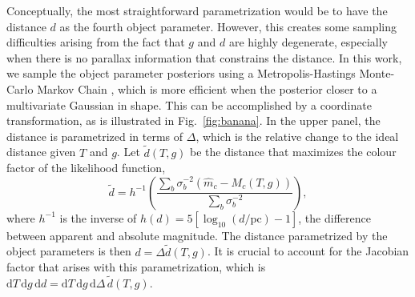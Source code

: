 \documentclass[fleqn,usenatbib]{mnras}
\newcommand{\Teff}{T}
\newcommand{\logg}{g}
\newcommand{\de}{\text{d}}
\begin{document}
Conceptually, the most straightforward parametrization would be to have the distance $d$ as the fourth object parameter. However, this creates some sampling difficulties arising from the fact that $\logg$ and $d$ are highly degenerate, especially when there is no parallax information that constrains the distance. In this work, we sample the object parameter posteriors using a Metropolis-Hastings Monte-Carlo Markov Chain \citep{1953JChPh..21.1087M,2018ApJS..236...11H}, which is more efficient when the posterior closer to a multivariate Gaussian in shape. This can be accomplished by a coordinate transformation, as is illustrated in Fig.~\ref{fig:banana}. In the upper panel, the distance is parametrized in terms of $\Delta$, which is the relative change to the ideal distance given $\Teff$ and $\logg$. Let $\tilde{d}(\Teff,\logg)$ be the distance that maximizes the colour factor of the likelihood function,
\begin{equation}
	\tilde{d} = 
    h^{-1}\left( \frac{\sum_b \sigma_b^{-2} (\hat{m}_c-M_c(\Teff,\logg))}{\sum_b \sigma_b^{-2}} \right),
\end{equation}
where $h^{-1}$ is the inverse of $h(d)=5[\log_{10}(d/\text{pc})-1]$, the difference between apparent and absolute magnitude. The distance parametrized by the object parameters is then $d=\Delta\tilde{d}(\Teff,\logg)$. It is crucial to account for the Jacobian factor that arises with this parametrization, which is $\de \Teff\, \de \logg\, \de d = \de \Teff\, \de \logg\, \de \Delta\, \tilde{d}(\Teff,\logg)$.
\end{document}
